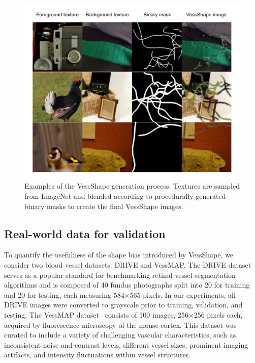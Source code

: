 \documentclass[%
reprint,
nofootinbib,
 amsmath,amssymb,
aps,
superscriptaddress,
showkeys,
longbibliography
]{revtex4-1}
\begin{document}
\begin{figure}[tbp]
    \centering
    \includegraphics[width=\columnwidth]{figures/results/vessshape_sample.pdf}
    \caption{Examples of the VessShape generation process. Textures are sampled from ImageNet and blended according to procedurally generated binary masks to create the final VessShape images.}
    \label{f:vessshape_sample}
\end{figure}

\subsection{Real-world data for validation}

To quantify the usefulness of the shape bias introduced by VessShape, we consider two blood vessel datasets: DRIVE and VessMAP. The DRIVE dataset~\cite{Staal2004} serves as a popular standard for benchmarking retinal vessel segmentation algorithms and is composed of 40 fundus photographs split into 20 for training and 20 for testing, each measuring 584×565 pixels. In our experiments, all DRIVE images were converted to grayscale prior to training, validation, and testing. The VessMAP dataset~\cite{viana2025new} consists of 100 images, 256×256 pixels each, acquired by fluorescence microscopy of the mouse cortex. This dataset was curated to include a variety of challenging vascular characteristics, such as inconsistent noise and contrast levels, different vessel sizes, prominent imaging artifacts, and intensity fluctuations within vessel structures.
\end{document}

